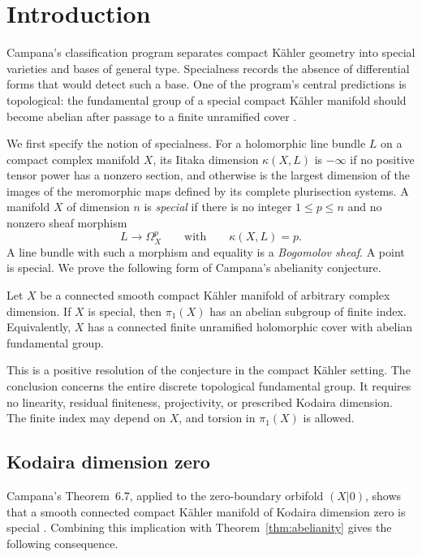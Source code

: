 \section{Introduction}\label{sec:introduction}

Campana's classification program separates compact K\"ahler geometry
into special varieties and bases of general type. Specialness records
the absence of differential forms that would detect such a base. One
of the program's central predictions is topological: the fundamental
group of a special compact K\"ahler manifold should become abelian
after passage to a finite unramified cover
\cite[Conjecture~A.1]{ClaudonHoring2013}.

We first specify the notion of specialness. For a holomorphic line
bundle \(L\) on a compact complex manifold \(X\), its Iitaka dimension
\(\kappa(X,L)\) is \(-\infty\) if no positive tensor power has a
nonzero section, and otherwise is the largest dimension of the images
of the meromorphic maps defined by its complete plurisection systems.
A manifold \(X\) of dimension \(n\) is \emph{special} if there is no
integer \(1\le p\le n\) and no nonzero sheaf morphism
\[
 L\longrightarrow\Omega_X^p
 \qquad\text{with}\qquad \kappa(X,L)=p.
\]
A line bundle with such a morphism and equality is a
\emph{Bogomolov sheaf}. A point is special. We prove the following
form of Campana's abelianity conjecture.

\begin{theorem}\label{thm:abelianity}
Let \(X\) be a connected smooth compact K\"ahler manifold of arbitrary
complex dimension. If \(X\) is special, then \(\pi_1(X)\) has an abelian
subgroup of finite index. Equivalently, \(X\) has a connected finite
unramified holomorphic cover with abelian fundamental group.
\end{theorem}

This is a positive resolution of the conjecture in the compact
K\"ahler setting. The conclusion concerns the entire discrete
topological fundamental group. It requires no linearity, residual
finiteness, projectivity, or prescribed Kodaira dimension. The finite
index may depend on \(X\), and torsion in \(\pi_1(X)\) is allowed.

\subsection{Kodaira dimension zero}

Campana's Theorem~6.7, applied to the zero-boundary orbifold
\((X|0)\), shows that a smooth connected compact K\"ahler manifold
of Kodaira dimension zero is special
\cite[Theorem~6.7, p.~92]{CampanaOrbifolds}. Combining this implication
with Theorem~\ref{thm:abelianity} gives the following consequence.


